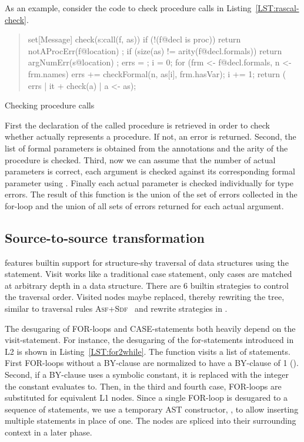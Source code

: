 As an example, consider the code to check procedure calls in Listing~\ref{LST:rascal-check}.
\begin{listing}
\begin{quote}
\begin{rascal}
set[Message] check(s:call(f, as)) {
  if (!(f@decl is proc)) 
    return { notAProcErr(f@location) };
  if (size(as) != arity(f@decl.formals)) 
    return { argNumErr(s@location) };
  errs = {}; i = 0;
  for (frm <- f@decl.formals, n <- frm.names) {
    errs += checkFormal(n, as[i], frm.hasVar);
    i += 1;
  }
  return ( errs | it + check(a) | a <- as);
}
\end{rascal}
\end{quote}
\caption{Checking \oberon procedure calls}
\label{LST:rascal-check}
\end{listing}
First the declaration of the called procedure is retrieved in order to
check whether  actually represents a procedure. If not, an
error is returned. Second, the list of formal parameters is obtained from
the  annotations and the arity of the procedure is
checked. Third, now we can assume that the number of actual parameters
is correct, each argument is checked against its corresponding formal
parameter using . Finally each actual parameter
is checked individually for type errors. The result of this function
is the union of the set of errors collected in the for-loop and the
union of all sets of errors returned for each actual argument.

\subsection{Source-to-source transformation}

\noindent \Rascal features builtin support for structure-shy traversal
of data structures using the  statement. Visit works like
a traditional case statement, only cases are matched at arbitrary
depth in a data structure. There are 6 builtin strategies to control
the traversal order. Visited nodes maybe replaced, thereby rewriting
the tree, similar to traversal rules \textsc{Asf+Sdf}~\cite{Traversals} and rewrite
strategies in \cite{Visser04}.


The desugaring of FOR-loops and CASE-statements both heavily depend on
the visit-statement. For instance, the desugaring of the
for-statements introduced in L2 is shown in
Listing~\ref{LST:for2while}. The function  visits
a list of statements. First FOR-loops without a BY-clause are
normalized to have a BY-clause of 1 (). Second, if a
BY-clause uses a symbolic constant, it is replaced with the integer
the constant evaluates to. Then, in the third and fourth case,
FOR-loops are substituted for equivalent L1 \oberon nodes. Since a
single FOR-loop is desugared to a sequence of statements, we use a
temporary AST constructor, , to allow inserting
multiple statements in place of one. The  nodes are
spliced into their surrounding context in a later phase. 

